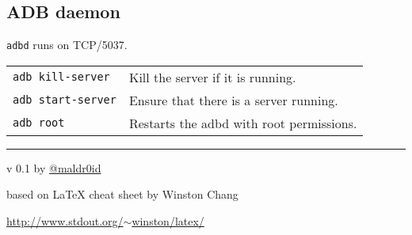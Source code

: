 \documentclass[11pt,landscape,a4paper]{article}
\begin{document}
\begin{multicols}{3}
\subsection{ADB daemon}
\texttt{adbd} runs on TCP/5037.

\vspace*{1mm}

\begin{tabular}{@{}ll@{}}

\texttt{adb kill-server}  & Kill the server if it is running.\\
\texttt{adb start-server} & Ensure that there is a server running.\\
\texttt{adb root} & Restarts the adbd with root permissions.\\
\end{tabular}

\rule{0.3\linewidth}{0.25pt}
\scriptsize

v 0.1 by \href{http://www.twitter.com/maldr0id}{@maldr0id}

based on \LaTeX{} cheat sheet by Winston Chang

\href{http://www.stdout.org/~winston/latex/}{http://www.stdout.org/$\sim$winston/latex/}


\end{multicols}
\end{document}
